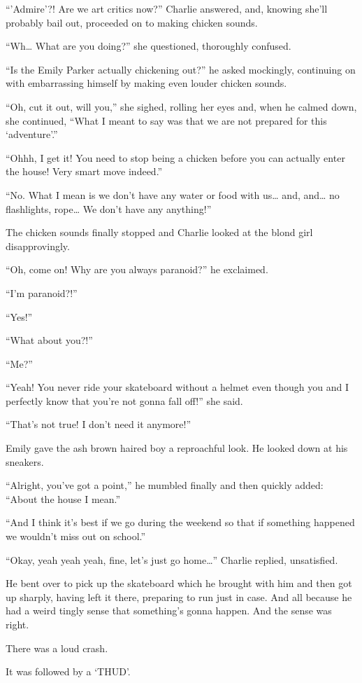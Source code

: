 “’Admire’?! Are we art critics now?” Charlie answered, and, knowing she’ll probably bail out, proceeded on to making chicken sounds.

“Wh… What are you doing?” she questioned, thoroughly confused.

“Is the Emily Parker actually chickening out?” he asked mockingly, continuing on with embarrassing himself by making even louder chicken sounds.

“Oh, cut it out, will you,” she sighed, rolling her eyes and, when he calmed down, she continued, “What I meant to say was that we are not prepared for this ‘adventure’.”

“Ohhh, I get it! You need to stop being a chicken before you can actually enter the house! Very smart move indeed.”
  
“No. What I mean is we don’t have any water or food with us… and, and… no flashlights, rope… We don’t have any anything!”

The chicken sounds finally stopped and Charlie looked at the blond girl disapprovingly.

“Oh, come on! Why are you always paranoid?” he exclaimed.

“I’m paranoid?!”

“Yes!”

“What about you?!”

“Me?”

“Yeah! You never ride your skateboard without a helmet even though you and I perfectly know that you’re not gonna fall off!” she said.

“That’s not true! I don’t need it anymore!”

Emily gave the ash brown haired boy a reproachful look. He looked down at his sneakers.

“Alright, you’ve got a point,” he mumbled finally and then quickly added: “About the house I mean.”

“And I think it’s best if we go during the weekend so that if something happened we wouldn’t miss out on school.”

“Okay, yeah yeah yeah, fine, let’s just go home…” Charlie replied, unsatisfied.

He bent over to pick up the skateboard which he brought with him and then got up sharply, having left it there, preparing to run just in case. And all because he had a weird tingly sense that something’s gonna happen. And the sense was right.

There was a loud crash.

It was followed by a ‘THUD’.

